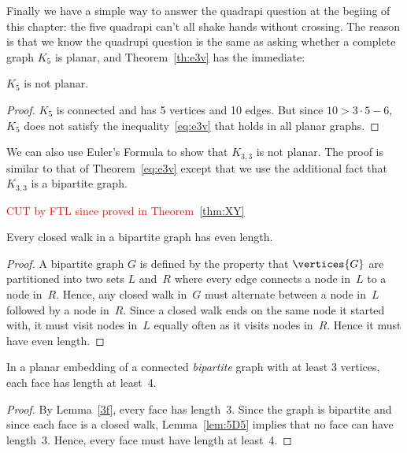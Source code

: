 Finally we have a simple way to answer the quadrapi question at the
begiing of this chapter: the five quadrapi can't all shake hands without
crossing.  The reason is that we know the quadrupi question is the same as
asking whether a complete graph $K_5$ is planar, and 
Theorem~\ref{th:e3v} has the immediate:
\begin{corollary}\label{k5not}
$K_5$ is not planar.
\end{corollary}
\begin{proof}
  $K_5$ is connected and has 5 vertices and 10 edges.  But since $10 > 3
  \cdot 5-6$, $K_5$ does not satisfy the inequality~\eqref{eq:e3v} that
  holds in all planar graphs.
\end{proof}

We can also use Euler's Formula to show that $K_{3, 3}$ is not
planar.  The proof is similar to that of Theorem~\ref{eq:e3v} except that
we use the additional fact that $K_{3, 3}$ is a bipartite graph.

\begin{editingnotes}
\textcolor{red}{CUT by FTL since proved in Theorem~\ref{thm:XY}}

\begin{lemma*}\label{lem:5D5}
Every closed walk in a bipartite graph has even length.
\end{lemma*}

\begin{proof}
A bipartite graph $G$ is defined by the property that $\vertices{G}$
are partitioned into two sets $L$ and~$R$ where every edge
connects a node in~$L$ to a node in~$R$.  Hence, any closed walk
in~$G$ must alternate between a node in~$L$ followed by a node
in~$R$.  Since a closed walk ends on the same node it started with, it
must visit nodes in~$L$ equally often as it visits nodes in~$R$.
Hence it must have even length.
\end{proof}

\begin{corollary}\label{cor:5D6}
In a planar embedding of a connected \emph{bipartite} graph with at
least 3 vertices, each face has length at least~4.
\end{corollary}
\begin{proof}
  By Lemma~\ref{3f}, every face has length~3.  Since the graph is
  bipartite and since each face is a closed walk, Lemma~\ref{lem:5D5}
  implies that no face can have length~3.  Hence, every face must have
  length at least~4.
\end{proof}
\end{editingnotes}

